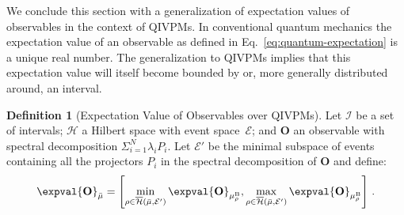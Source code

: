\documentclass[english,reprint, aps, prl,superscriptaddress, showpacs,
showkeys, longbibliography, amsmath, amssymb, floatfix]{revtex4-1}
\theoremstyle{plain}
\theoremstyle{definition}
\newtheorem{definition}{Definition}
\newcommand{\Hilb}{\mathcal{H}}
\newcommand{\events}{\ensuremath{\mathcal{E}}}
\newcommand{\coreBorn}{\ensuremath{\overline{\Hilb}}}
\begin{document}
We conclude this section with a generalization of expectation values
of observables in the context of QIVPMs. In conventional quantum
mechanics the expectation value of an observable as defined in
Eq.~\eqref{eq:quantum-expectation} is a unique real number. The
generalization to QIVPMs implies that this expectation value will
itself become bounded by or, more generally distributed around, an interval. 

\begin{definition}[Expectation Value of Observables over QIVPMs] Let
  $\mathscr{I}$ be a set of intervals; $\Hilb$ a Hilbert space
  with event space~$\events$; and $\mathbf{O}$ an
  observable with spectral decomposition
  $\Sigma_{i=1}^N \lambda_iP_i$. Let $\events'$ be the minimal
  subspace of events containing all the projectors $P_i$ in the
  spectral decomposition of $\mathbf{O}$ and define:
\begin{equation}
\expval{\mathbf{O}}_{\bar{\mu}}=\left[\min_{\rho\in\coreBorn\left(\bar{\mu},\events'\right)}
\expval{\mathbf{O}}_{\mu_{\rho}^{\mathrm{B}}},\max_{\rho\in\coreBorn\left(\bar{\mu},\events'\right)}
\expval{\mathbf{O}}_{\mu_{\rho}^{\mathrm{B}}}\right]\,. \label{eq:quantum-interval-expectation-core}
\end{equation}
\end{definition}
\end{document}
